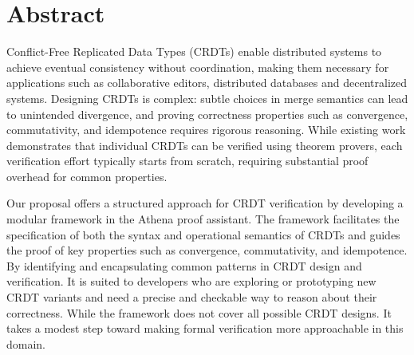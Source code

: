 
\chapter{Abstract}

Conflict-Free Replicated Data Types (CRDTs) enable distributed systems to achieve eventual consistency without coordination, making them necessary for applications such as collaborative editors, distributed databases and decentralized systems. Designing CRDTs is complex: subtle choices in merge semantics can lead to unintended divergence, and proving correctness properties such as convergence, commutativity, and idempotence requires rigorous reasoning. While existing work demonstrates that individual CRDTs can be verified using theorem provers, each verification effort typically starts from scratch, requiring substantial proof overhead for common properties.

Our proposal offers a structured approach for CRDT verification by developing a modular framework in the Athena proof assistant. The framework facilitates the specification of both the syntax and operational semantics of CRDTs and guides the proof of key properties such as convergence, commutativity, and idempotence. By identifying and encapsulating common patterns in CRDT design and verification. It is suited to developers who are exploring or prototyping new CRDT variants and need a precise and checkable way to reason about their correctness. While the framework does not cover all possible CRDT designs. It takes a modest step toward making formal verification more approachable in this domain.

\endinput